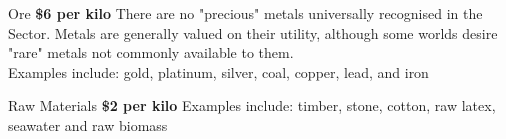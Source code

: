 \begin{genericsection}{Ore}
\textbf{\$6 per kilo}
There are no "precious" metals universally recognised in the Sector. Metals are generally valued on their utility, although some worlds desire "rare" metals not commonly available to them.\\
Examples include: gold, platinum, silver, coal, copper, lead, and iron
\end{genericsection}

\begin{genericsection}{Raw Materials}
\textbf{\$2 per kilo}
Examples include: timber, stone, cotton, raw latex, seawater and raw biomass
\end{genericsection}

